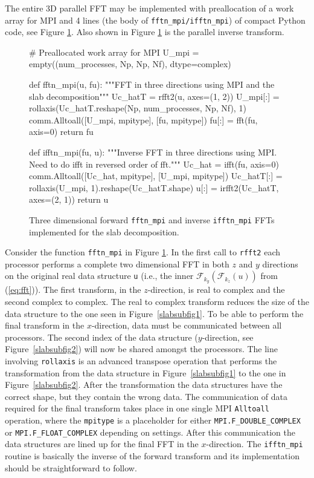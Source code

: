 \documentclass[final,3p,times,twocolumn]{elsarticle}
\newcommand{\inpyth}{\lstinline[style=inlinestyle]} %[]%
\begin{document}
The entire 3D parallel FFT may be implemented with preallocation of a work 
array for MPI and 4 lines (the body of \inpyth{fftn_mpi/ifftn_mpi}) of compact 
Python code, see Figure \ref{fig:fftn_slab}. Also shown in Figure 
\ref{fig:fftn_slab} is the parallel inverse transform.
\begin{figure}
\begin{python}
# Preallocated work array for MPI
U_mpi = empty((num_processes, Np, Np, Nf), dtype=complex)

def fftn_mpi(u, fu):
    """FFT in three directions using MPI and the slab decomposition"""
    Uc_hatT = rfft2(u, axes=(1, 2))
    U_mpi[:] = rollaxis(Uc_hatT.reshape(Np, num_processes, Np, Nf), 1)
    comm.Alltoall([U_mpi, mpitype], [fu, mpitype])
    fu[:] = fft(fu, axis=0)
    return fu

def ifftn_mpi(fu, u):
    """Inverse FFT in three directions using MPI.
       Need to do ifft in reversed order of fft."""
    Uc_hat = ifft(fu, axis=0)
    comm.Alltoall([Uc_hat, mpitype], [U_mpi, mpitype])
    Uc_hatT[:] = rollaxis(U_mpi, 1).reshape(Uc_hatT.shape)
    u[:] = irfft2(Uc_hatT, axes=(2, 1))
    return u
\end{python}
\caption{Three dimensional forward \inpyth{fftn_mpi} and inverse \inpyth{ifftn_mpi} FFTs implemented for the slab decomposition.}
\label{fig:fftn_slab}
\end{figure}
Consider the function \inpyth{fftn_mpi} in Figure \ref{fig:fftn_slab}. In the 
first call to \inpyth{rfft2} each processor performs a
complete two dimensional FFT in both $z$ and $y$ directions on the original real data structure \inpyth{u}
(i.e., the inner $\mathcal{F}_{k_y}(\mathcal{F}_{k_z}(u))$ from (\ref{eq:fft})).
The first transform, in the $z$-direction, is real to complex and the second complex to complex. The real
to complex transform reduces the size of the data structure to the one seen in Figure~\ref{slabsubfig1}.
To be able to perform the final transform in the $x$-direction, data must be communicated between all
processors. The second index of the data structure ($y$-direction, see Figure~\ref{slabsubfig2}) will now be
shared amongst the processors. The line involving \inpyth{rollaxis} is an 
advanced transpose operation that performs
the transformation from the data structure in Figure~\ref{slabsubfig1} to the one in Figure~\ref{slabsubfig2}.
After the transformation the data structures have the correct shape, but they contain the wrong data. The
communication of data required for the final transform takes place in one single MPI \inpyth{Alltoall}
operation, where the \inpyth{mpitype} is a placeholder for either \inpyth{MPI.F_DOUBLE_COMPLEX} or
\inpyth{MPI.F_FLOAT_COMPLEX} depending on settings. After this communication the data structures are lined
up for the final FFT in the $x$-direction. The \inpyth{ifftn_mpi} routine is basically the inverse of the
forward transform and its implementation should be straightforward to follow.
\end{document}
